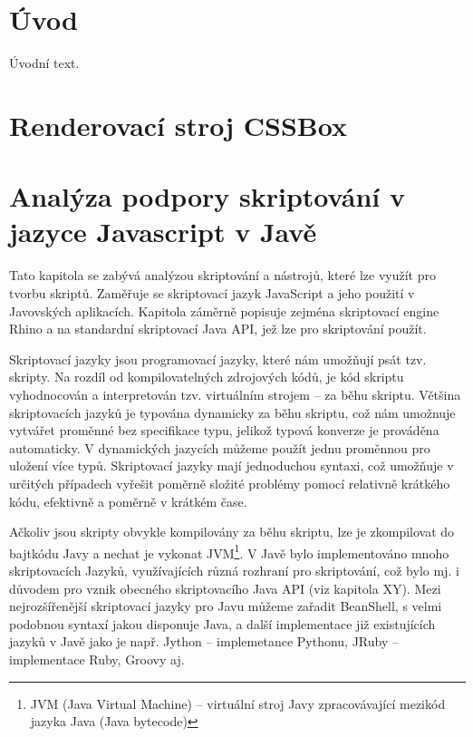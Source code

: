 
\chapter{Úvod}
\label{Chapter.Introducion}
Úvodní text.

\chapter{Renderovací stroj CSSBox}
\label{Chapter.CSSBox}

\chapter{Analýza podpory skriptování v jazyce Javascript v Javě}
\label{Chapter.JavaScriptInJavaAnalysis}

Tato kapitola se zabývá analýzou skriptování a nástrojů, které lze využít pro tvorbu skriptů. Zaměřuje se skriptovací jazyk JavaScript a jeho použití v Javovských aplikacích. Kapitola záměrně popisuje zejména skriptovací engine Rhino a na standardní skriptovací Java API, jež lze pro skriptování použít.

Skriptovací jazyky jsou programovací jazyky, které nám umožňují psát tzv. skripty. Na rozdíl od kompilovatelných zdrojových kódů, je kód skriptu vyhodnocován a interpretován tzv. virtuálním strojem – za běhu skriptu. Většina skriptovacích jazyků je typována dynamicky za běhu skriptu, což nám umožnuje vytvářet proměnné bez specifikace typu, jelikož typová konverze je prováděna automaticky. V dynamických jazycích můžeme použít jednu proměnnou pro uložení více typů. Skriptovací jazyky mají jednoduchou syntaxi, což umožňuje v určitých případech vyřešit poměrně složité problémy pomocí relativně krátkého kódu, efektivně a poměrně v krátkém čase.

Ačkoliv jsou skripty obvykle kompilovány za běhu skriptu, lze je zkompilovat do bajtkódu Javy a nechat je vykonat JVM\footnote{JVM  (Java Virtual Machine) -- virtuální stroj Javy zpracovávající mezikód jazyka Java (Java bytecode)}. V Javě bylo implementováno mnoho skriptovacích Jazyků, využívajících různá rozhraní pro skriptování, což bylo mj. i důvodem pro vznik obecného skriptovacího Java API (viz kapitola XY). Mezi nejrozšířenější skriptovací jazyky pro Javu můžeme zařadit BeanShell, s velmi podobnou syntaxí jakou disponuje Java, a další implementace již existujících jazyků v Javě jako je např. Jython – implemetance Pythonu,  JRuby – implementace Ruby, Groovy aj.

